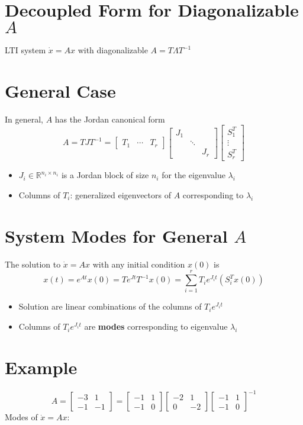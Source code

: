 \documentclass[10pt,a4paper,oneside]{article}
\begin{document}
\section{Decoupled Form for Diagonalizable $A$}
LTI system $\dot{x}=A x$ with diagonalizable $A=T\Lambda T^{-1}$
\section{General Case}
In general, $A$ has the Jordan canonical form
\[
A=T J T^{-1}=\left[\begin{array}{lll}{T_{1}} & {\cdots} & {T_{r}}\end{array}\right]\left[\begin{array}{lll}{J_{1}} & {} \\ {} & {\ddots} & {} \\ {} & {} & {J_{r}}\end{array}\right]\left[\begin{array}{c}{S_{1}^{T}} \\ {\vdots} \\ {S_{r}^{T}}\end{array}\right]
\]
\begin{itemize}
\item $J_{i} \in \mathbb{R}^{n_{i} \times n_{i}}$ is a Jordan block of size $n_{i}$ for the eigenvalue $\lambda_{i}$
\item Columns of $T_{i}$: generalized eigenvectors of $A$ corresponding to $\lambda_{i}$
\end{itemize}
\section{System Modes for General $A$}
The solution to $\dot{x}=A x$ with any initial condition $x(0)$ is
\[
x(t)=e^{A t} x(0)=T e^{J t} T^{-1} x(0)= \sum_{i=1}^{r} T_{i} e^{J_{i} t}\left(S_{i}^{T} x(0)\right)
\]
\begin{itemize}
\item Solution are linear combinations of the columns of $T_{i} e^{J_{i} t}$
\item Columns of $T_{i} e^{J_{i} t}$ are {\bfseries modes} corresponding to eigenvalue $\lambda_{i}$
\end{itemize}
\section{Example}
\[A=\left[\begin{array}{rr}{-3} & {1} \\ {-1} & {-1}\end{array}\right]=\left[\begin{array}{ll}{-1} & {1} \\ {-1} & {0}\end{array}\right]\left[\begin{array}{cc}{-2} & {1} \\ {0} & {-2}\end{array}\right]\left[\begin{array}{rr}{-1} & {1} \\ {-1} & {0}\end{array}\right]^{-1}\]
Modes of $\dot{x}=Ax$:
\end{document}
